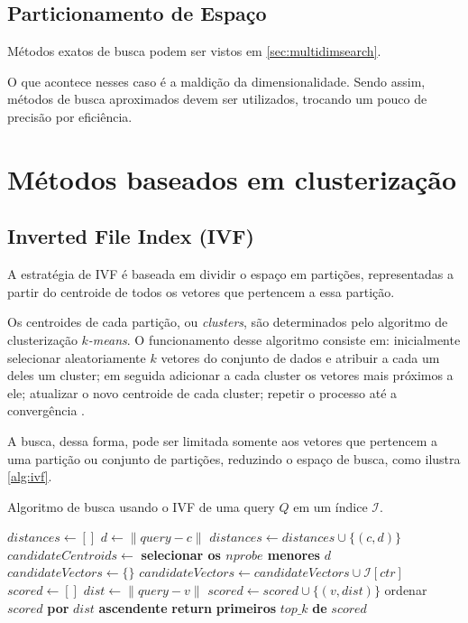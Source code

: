 \subsection{Particionamento de Espaço}

Métodos exatos de busca podem ser vistos em \cref{sec:multidimsearch}.

O que acontece nesses caso é a maldição da dimensionalidade. Sendo assim, métodos de busca aproximados devem ser utilizados, trocando um pouco de precisão por eficiência.

\section{Métodos baseados em clusterização}

\subsection{Inverted File Index (IVF)}

A estratégia de IVF é baseada em dividir o espaço em partições, representadas a partir do centroide de todos os vetores que pertencem a essa partição.

Os centroides de cada partição, ou \textit{clusters}, são determinados pelo algoritmo de clusterização \textit{$k$-means}. O funcionamento desse algoritmo consiste em: inicialmente selecionar aleatoriamente $k$ vetores do conjunto de dados e atribuir a cada um deles um cluster; em seguida adicionar a cada cluster os vetores mais próximos a ele; atualizar o novo centroide de cada cluster; repetir o processo até a convergência \cite{kmeans:wiki, lloydsalg:wiki}.

A busca, dessa forma, pode ser limitada somente aos vetores que pertencem a uma partição ou conjunto de partições, reduzindo o espaço de busca, como ilustra \cref{alg:ivf}.

\begin{algorithm}
\caption{Algoritmo de busca usando o IVF de uma query $Q$ em um índice $\mathcal{I}$.}
\label{alg:ivf}
\begin{algorithmic}[1]
    \State $distances \gets []$
        \State $d \gets \|query - c\|$
        \State $distances \gets distances \cup \{(c, d)\}$
    \EndFor
    \State $candidateCentroids \gets$ \textbf{selecionar os $nprobe$ menores} $d$
    \State $candidateVectors \gets \{\}$
        \State $candidateVectors \gets candidateVectors \cup \mathcal{I}[ctr]$
    \EndFor
    \State $scored \gets []$
        \State $dist \gets \|query - v\|$
        \State $scored \gets scored \cup \{(v, dist)\}$
    \EndFor
    \State ordenar $scored$ \textbf{por} $dist$ \textbf{ascendente}
    \State \textbf{return} \textbf{primeiros} $top\_k$ \textbf{de} $scored$
\EndProcedure
\end{algorithmic}
\end{algorithm}


